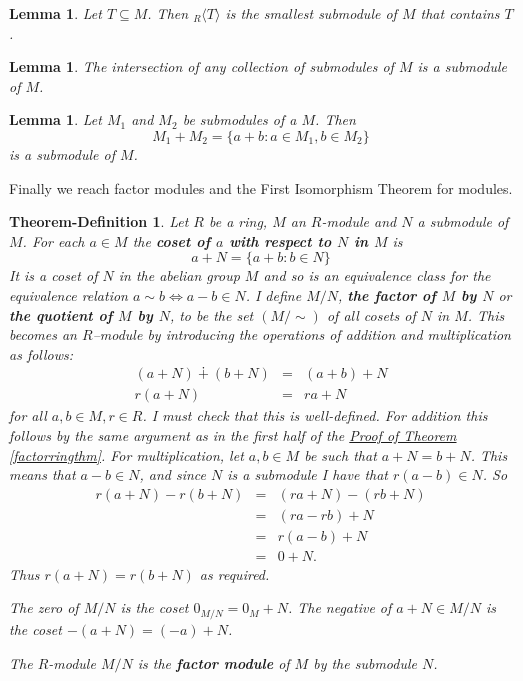 \documentclass[11pt]{amsbook}
\newtheorem{lemma}[theorem]{Lemma}
\newtheorem{thedef}[theorem]{Theorem-Definition}
\theoremstyle{definition}
\begin{document}
\begin{lemma}
Let $T\subseteq M$. Then ${}_R\langle T
\rangle$ is the smallest submodule of $M$ that contains $T$.
\end{lemma}

\begin{lemma} \label{intsubmod} The intersection of any collection of submodules of $M$ is a submodule of $M$. \end{lemma}

\begin{lemma} Let $M_1$ and $M_2$ be submodules of a $M$. Then $$M_1+M_2 = \{ a+ b: a\in M_1, b\in M_2\}$$ is a submodule of $M$. \end{lemma}

Finally we reach factor modules and the First Isomorphism Theorem for modules.

\begin{thedef} Let $R$ be a ring, $M$ an $R$-module and $N$ a submodule of $M$. For each $a\in M$ the {\bf coset of $a$ with respect to $N$ in $M$} is $$a+N = \{ a+ b: b\in N\}$$ It is a coset of $N$ in the abelian group $M$ and so is an equivalence class for the equivalence relation $a\sim b \Leftrightarrow a-b\in N$. I define $M/N$,
{\bf the factor of $M$ by $N$} or {\bf the quotient of $M$ by $N$}, to be the set $(M/\sim)$ of all cosets of $N$ in $M$. This becomes an $R$--module by introducing the operations of addition and multiplication as follows:
\begin{eqnarray*} (a+N) \dotplus (b+N) &=& (a+b) + N \\ r(a+N) &=& ra + N
\end{eqnarray*}
for all $a,b\in M, r\in R$. I must check that this is well-defined. For addition this follows by the same argument as in the first half of the \hyperref[factorringthm]{Proof of Theorem \ref{factorringthm}}. For multiplication, let $a,b\in M$ be such that $a+N = b+N$. This means that $a-b\in N$, and since $N$ is a submodule I have that $r(a-b) \in N$. So \begin{eqnarray*} r(a+N) - r(b+N) &=& (ra+N) - (rb +N) \\ & = & (ra-rb) + N \\ & =& r(a-b) + N \\ & = & 0 + N.\end{eqnarray*} Thus $r(a+N) = r(b+N)$ as required.

The zero of $M/N$ is the coset $0_{M/N} = 0_M +
N$. The negative of $a+N \in M/N$ is the coset $-(a+N) = (-a) + N$.

The $R$-module $M/N$ is the {\bf factor module} of $M$ by the submodule $N$.
\end{thedef}
\end{document}
